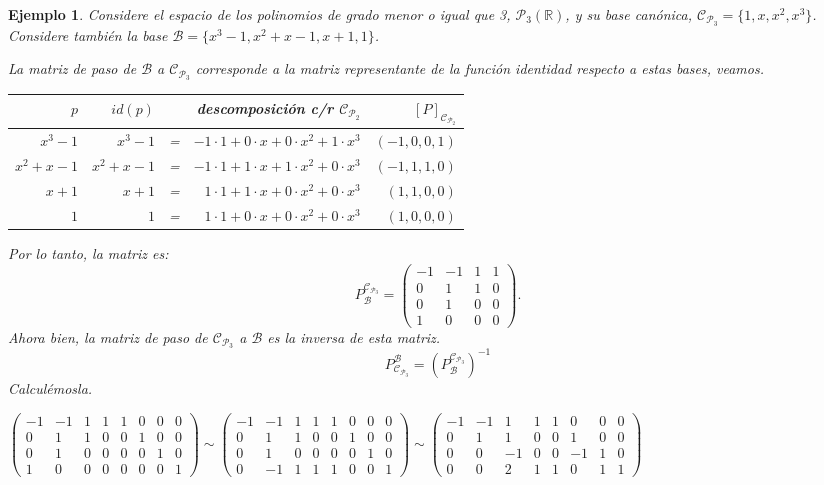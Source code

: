 \documentclass[12pt]{book}
\newtheorem{ejem}{Ejemplo}
\def\R{\mathbb{R}}
\def\P{\mathcal{P}}
\def\B{\mathcal{B}}
\def\Ccal{\mathcal{C}}
\begin{document}
\begin{ejem}
Considere el espacio de los polinomios de grado menor o igual que 3, $\mathcal{P}_3(\R)$, y su base canónica, $\Ccal_{\P_3}=\{1,x,x^2,x^3\}$.
Considere también la base $\B=\{ x^3-1, x^2+x-1, x+1,1\}$.

{\em La matriz de paso de $\B$ a $\Ccal_{\P_3}$ corresponde a la matriz representante de la función identidad respecto a estas bases, veamos.

\begin{tabular}{r|rcr|r}
$p$&$id(p)$&&descomposición c/r $\Ccal_{\P_2}$&$[P]_{\Ccal_{\P_2}}$\\\hline
$x^3-1$ & $x^3-1$ &=&$-1\cdot1+0\cdot x+0\cdot x^2+1\cdot x^3$& $(-1,0,0,1)$\\
$x^2+x-1$& $x^2+x-1$&=&$-1\cdot1+1\cdot x+1\cdot x^2+0\cdot x^3$& $(-1,1,1,0)$\\
$x+1$&$x+1$&=&$1\cdot1+1\cdot x+0\cdot x^2+0\cdot x^3$& $(1,1,0,0)$\\
$1$&$1$&=&$1\cdot1+0\cdot x+0\cdot x^2+0\cdot x^3$& $(1,0,0,0)$\\
\end{tabular}

Por lo tanto, la matriz es:
$$P_{\B}^{\Ccal_{\P_3}} = \left(\begin{array}{rrrr}
-1&-1&1&1\\
0&1&1&0\\
0&1&0&0\\
1&0&0&0
\end{array}\right).
$$
Ahora bien, la matriz  de paso de $\Ccal_{\P_3}$ a $\B$ es la inversa de esta matriz.
$$P_{\Ccal_{\P_3}}^{\B} = (P_{\B}^{\Ccal_{\P_3}})^{-1}
$$
Calculémosla.

{\small
$
\left(\begin{array}{rrrr|rrrr}
-1&-1&1&1&1&0&0&0\\
0&1&1&0&0&1&0&0\\
0&1&0&0&0&0&1&0\\
1&0&0&0&0&0&0&1
\end{array}\right)
\sim
\left(\begin{array}{rrrr|rrrr}
-1&-1&1&1&1&0&0&0\\
0&1&1&0&0&1&0&0\\
0&1&0&0&0&0&1&0\\
0&-1&1&1&1&0&0&1
\end{array}\right)
\sim
\left(\begin{array}{rrrr|rrrr}
-1&-1&1&1&1&0&0&0\\
0&1&1&0&0&1&0&0\\
0&0&-1&0&0&-1&1&0\\
0&0&2&1&1&0&1&1
\end{array}\right)
$\\

}}
\end{ejem}
\end{document}

